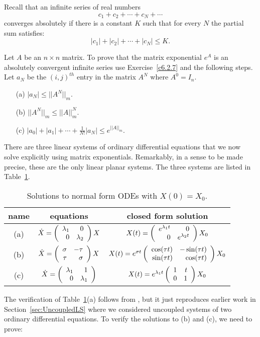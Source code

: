 \begin{exercise} \label{c6.2.8}
Recall that an infinite series of real numbers
\[
c_1+c_2 +\cdots+c_N + \cdots
\]
converges absolutely if there is a constant $K$ such that for every $N$
the partial sum satisfies:
\[
|c_1| + |c_2| + \cdots + |c_N| \leq K.
\]

Let $A$ be an $n\times n$ matrix.  To prove that the matrix exponential $e^A$
is an absolutely convergent infinite series use Exercise~\ref{c6.2.7} and the
following steps.  Let $a_N$ be the $(i,j)^{th}$ entry in the matrix $A^N$
where $A^0=I_n$.
\begin{itemize}
\item[(a)]  $|a_N| \leq ||A^N||_m$.
\item[(b)]  $||A^N||_m \leq ||A||_m^N$.
\item[(c)]  $|a_0| + |a_1| + \cdots + \frac{1}{N!}|a_N| \leq e^{||A||_m}$.
\end{itemize}
\end{exercise}


 
\label{S:LNFPS}

There are three linear systems of ordinary differential equations
that we now solve explicitly using matrix exponentials.  Remarkably,
in a sense to be made precise, these are the only linear planar systems.
The three systems are listed in Table~\ref{T:3sys}.


\begin{table}[htb]
\begin{center}
\begin{tabular}{|c|c|c|}
\hline
name  & equations & closed form solution \\
\hline
(a) & $\dot{X} = \left(\begin{array}{rr} \lambda_1 & 0\\ 0 &\lambda_2\end{array}\right) X$ &
$X(t) = \left(\begin{array}{rr} e^{\lambda_1 t} & 0\\ 0 &e^{\lambda_2 t}\end{array}\right)X_0$ \\
\hline
(b) & $\dot{X}=\left(\begin{array}{rr} \sigma & -\tau\\ \tau &\sigma\end{array}\right)X$ & $X(t) = e^{\sigma t}
\left(\begin{array}{rr} \cos(\tau t) & -\sin(\tau t)\\ \sin(\tau t) &\cos(\tau t)\end{array}\right)X_0$\\
\hline
(c) & $\dot{X} = \left(\begin{array}{rr} \lambda_1 & 1\\ 0 &\lambda_1\end{array}\right)$ &
$X(t) = e^{\lambda_1 t}\left(\begin{array}{rr} 1 & t\\ 0 &1\end{array}\right)X_0$ \\
\hline
\end{tabular}
\caption{Solutions to normal form ODEs with $X(0)=X_0$.}
\label{T:3sys}
\end{center}
\end{table}

The verification of Table~\ref{T:3sys}(a) follows from , but
it just reproduces earlier work in Section~\ref{sec:UncoupledLS} where we
considered uncoupled systems of two ordinary differential equations.
To verify the solutions to (b) and (c), we need to prove:

